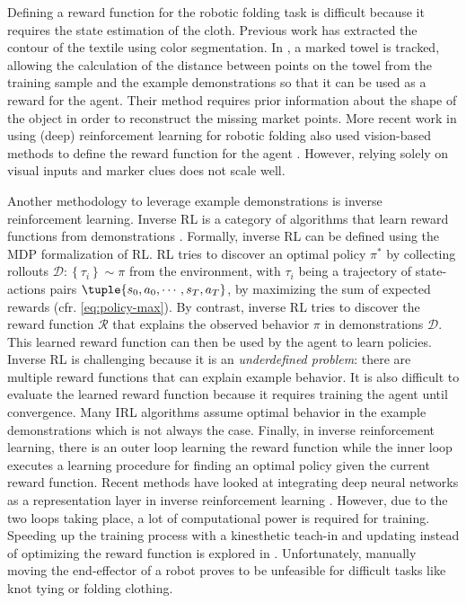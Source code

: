 \documentclass[\home/main.tex]{subfiles}
\begin{document}
Defining a reward function for the robotic folding task is difficult because it requires the state estimation of the cloth. Previous work \autocite{Doumanoglou2016,Miller2012} has extracted the contour of the textile using color segmentation. In \autocite{Balaguer2011}, a marked towel is tracked, allowing the calculation of the distance between points on the towel from the training sample and the example demonstrations so that it can be used as a reward for the agent. Their method requires prior information about the shape of the object in order to reconstruct the missing market points. More recent work in using (deep) reinforcement learning for robotic folding also used vision-based methods to define the reward function for the agent \autocite{Tsurumine2019, Matas2018}. However, relying solely on visual inputs and marker clues does not scale well. 

Another methodology to leverage example demonstrations is inverse reinforcement learning. Inverse RL is a category of algorithms that learn reward functions from demonstrations \autocite{Ng2000}. Formally, inverse RL can be defined using the \gls{MDP} formalization of RL. RL tries to discover an optimal policy $\pi^*$ by collecting rollouts $\mathcal{D}:\left\{\tau_{i}\right\} \sim \pi$ from the environment, with $\tau_{i}$ being a trajectory of state-actions pairs $\tuple{s_0, a_0, \cdots, s_T, a_T}$, by maximizing the sum of expected rewards (cfr. \cref{eq:policy-max}). By contrast, inverse RL tries to discover the reward function $\mathcal{R}$ that explains the observed behavior $\pi$ in demonstrations $\mathcal{D}$. This learned reward function can then be used by the agent to learn policies. Inverse RL is challenging because it is an \emph{underdefined problem}: there are multiple reward functions that can explain example behavior. It is also difficult to evaluate the learned reward function because it requires training the agent until convergence. Many IRL algorithms assume optimal behavior in the example demonstrations which is not always the case. Finally, in inverse reinforcement learning, there is an outer loop learning the reward function while the inner loop executes a learning procedure for finding an optimal policy given the current reward function. Recent methods have looked at integrating deep neural networks as a representation layer in inverse reinforcement learning \autocite{Finn2016,Ho2016,Fu2018}. However, due to the two loops taking place, a lot of computational power is required for training. Speeding up the training process with a kinesthetic teach-in and updating instead of optimizing the reward function is explored in \autocite{Finn2016}. Unfortunately, manually moving the end-effector of a robot proves to be unfeasible for difficult tasks like knot tying or folding clothing.
\end{document}
